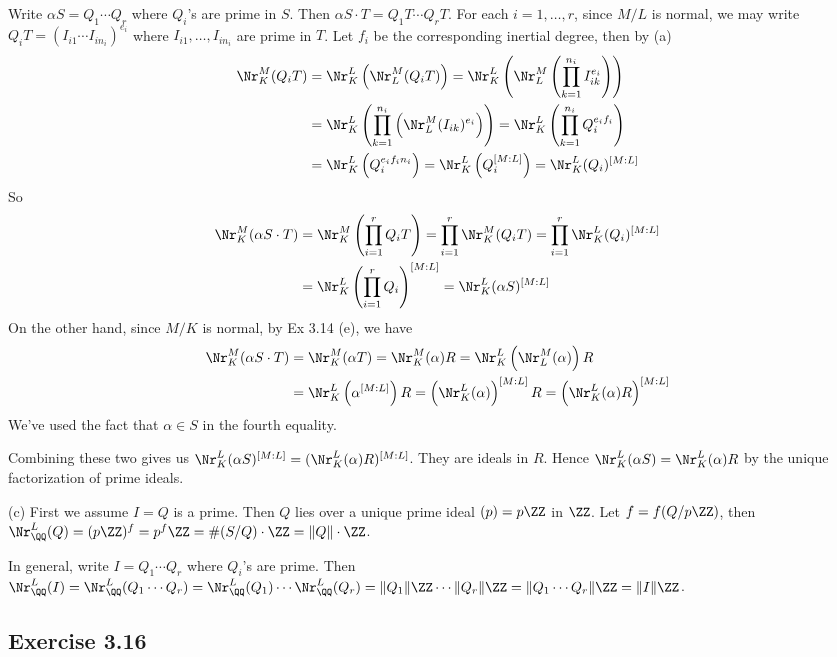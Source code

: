 \documentclass[../Chapter.tex]{subfiles}
\begin{document}
Write $\alpha S=Q_1\cdots Q_r$ where $Q_i$'s are prime in $S$. Then $\alpha S\cdot T=Q_1T\cdots Q_rT$. For each $i=1,\ldots,r$, since $M/L$ is normal, we may write $Q_iT=(I_{i1}\cdots I_{in_i})^{e_i}$ where $I_{i1},\ldots,I_{in_i}$ are prime in $T$. Let $f_i$ be the corresponding inertial degree, then by (a)
\begin{align*}
\Nr^M_K(Q_iT) &= \Nr^L_K\left(\Nr^M_L(Q_iT)\right) = \Nr^L_K\left(\Nr^M_L\left(\prod_{k=1}^{n_i} I_{ik}^{e_i}\right)\right) \\
&= \Nr^L_K\left(\prod_{k=1}^{n_i}\left(\Nr^M_L (I_{ik})^{e_i}\right)\right) = \Nr^L_K\left(\prod_{k=1}^{n_i} Q_i^{e_if_i}\right) \\
&= \Nr^L_K\left(Q_i^{e_if_in_i}\right) = \Nr^L_K\left(Q_i^{[M:L]}\right) = \Nr^L_K(Q_i)^{[M:L]}
\end{align*}
So
\begin{align*}
\Nr^M_K(\alpha S\cdot T) &= \Nr^M_K\left(\prod_{i=1}^r Q_iT\right) = \prod_{i=1}^r \Nr^M_K(Q_iT) = \prod_{i=1}^r \Nr^L_K(Q_i)^{[M:L]} \\
&= \Nr^L_K\left(\prod_{i=1}^r Q_i\right)^{[M:L]} = \Nr^L_K(\alpha S)^{[M:L]}
\end{align*}
On the other hand, since $M/K$ is normal, by Ex 3.14 (e), we have
\begin{align*}
\Nr^M_K(\alpha S\cdot T) &= \Nr^M_K(\alpha T) = \Nr^M_K(\alpha)R = \Nr^L_K\left(\Nr^M_L(\alpha)\right)R \\
&= \Nr^L_K\left(\alpha^{[M:L]}\right)R = \left(\Nr^L_K(\alpha)\right)^{[M:L]}R = \left(\Nr^L_K(\alpha)R\right)^{[M:L]} 
\end{align*}
We've used the fact that $\alpha\in S$ in the fourth equality.

Combining these two gives us $\Nr^L_K(\alpha S)^{[M:L]}=(\Nr^L_K(\alpha)R)^{[M:L]}$. They are ideals in $R$. Hence $\Nr^L_K(\alpha S)=\Nr^L_K(\alpha)R$ by the unique factorization of prime ideals.

(c) First we assume $I=Q$ is a prime. Then $Q$ lies over a unique prime ideal $(p)=p\ZZ$ in $\ZZ$. Let $f=f(Q/p\ZZ)$, then $\Nr^L_\QQ(Q)=(p\ZZ)^f=p^f\ZZ=\#(S/Q)\cdot\ZZ=\|Q\|\cdot\ZZ$.

In general, write $I=Q_1\cdots Q_r$ where $Q_i$'s are prime. Then $\Nr^L_\QQ(I)=\Nr^L_\QQ(Q_1\cdots Q_r)=\Nr^L_\QQ(Q_1)\cdots\Nr^L_\QQ(Q_r)=\|Q_1\|\ZZ\cdots\|Q_r\|\ZZ=\|Q_1\cdots Q_r\|\ZZ=\|I\|\ZZ$.

\subsection*{Exercise 3.16}
\end{document}
